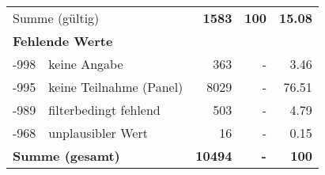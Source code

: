 \begin{longtable}{lXrrr}
     \midrule
     \multicolumn{2}{l}{Summe (gültig)} &
       \textbf{\num{1583}} &
     \textbf{\num{100}} &
       \textbf{\num[round-mode=places,round-precision=2]{15.08}} \\
     \multicolumn{5}{l}{\textbf{Fehlende Werte}}\\
       -998 &
       keine Angabe &
         \num{363} &
        - &
         \num[round-mode=places,round-precision=2]{3.46} \\
       -995 &
       keine Teilnahme (Panel) &
         \num{8029} &
        - &
         \num[round-mode=places,round-precision=2]{76.51} \\
       -989 &
       filterbedingt fehlend &
         \num{503} &
        - &
         \num[round-mode=places,round-precision=2]{4.79} \\
       -968 &
       unplausibler Wert &
         \num{16} &
        - &
         \num[round-mode=places,round-precision=2]{0.15} \\
     \midrule
     \multicolumn{2}{l}{\textbf{Summe (gesamt)}} &
          \textbf{\num{10494}} &
        \textbf{-} &
        \textbf{\num{100}} \\
     \bottomrule
     \end{longtable}
     
